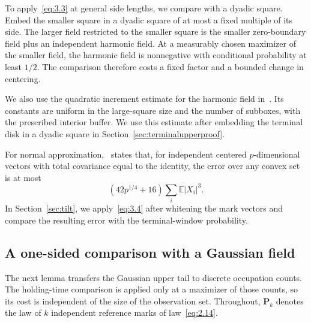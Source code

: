 \documentclass[11pt,letterpaper,reqno]{amsart}
\newif\ifrevmarks \revmarkstrue
\newif\ifshowdeleted \showdeletedfalse
\newcommand{\add}[1]{\ifrevmarks\textcolor{revorange}{#1}\else#1\fi}
\newcommand{\del}[1]{\ifrevmarks\ifshowdeleted{\color{revorange}\footnotesize[\textit{deleted:}~#1]}%
  \else\mbox{\textsuperscript{\textcolor{revorange}{\normalfont\bfseries[del]}}}\fi\fi}
\numberwithin{equation}{section}
\theoremstyle{remark}
\begin{document}
To apply~\eqref{eq:3.3} at general side lengths, we compare with a dyadic square. Embed the smaller square in a dyadic square of at most a fixed multiple of its side. The larger field restricted to the smaller square is the smaller zero-boundary field plus an independent harmonic field. At a measurably chosen maximizer of the smaller field, the harmonic field is nonnegative with conditional probability at least $1/2$. The comparison therefore costs a fixed factor and a bounded change in centering.

We also use the quadratic increment estimate for the harmonic field in~\cite[Lemma 3.10, equation (45)]{BDZ}. Its constants are uniform in the large-square size and the number of subboxes, with the prescribed interior buffer. We use this estimate after embedding the terminal disk in a dyadic square in Section~\ref{sec:terminalupperproof}.

For normal approximation,~\cite[Theorem 1.1]{BE} states that, for independent centered $p$-dimensional vectors with total covariance equal to the identity, the error over any convex set is at most
\begin{equation}\label{eq:3.4}
(42p^{1/4}+16)\sum_i\mathbb E|X_i|^3.
\end{equation}
In Section~\ref{sec:tilt}, we apply~\eqref{eq:3.4} after whitening the mark vectors and compare the resulting error with the terminal-window probability.

\subsection{\texorpdfstring{\del{Proof of Lemma~\ref{lem:oneway}}\add{A one-sided comparison with a Gaussian field}}{A one-sided comparison with a Gaussian field}}\label{sec:oneway}
The next lemma transfers the Gaussian upper tail to discrete occupation counts. The holding-time comparison is applied only at a maximizer of those counts, so its cost is independent of the size of the observation set. \add{Throughout, $\mathbf P_k$ denotes the law of $k$ independent reference marks of law~\eqref{eq:2.14}.}
\end{document}
